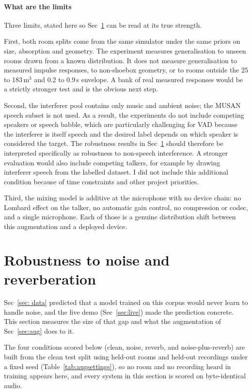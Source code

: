 \documentclass{article}
\begin{document}
\paragraph{What are the limits} Three limits, stated here so Sec~\ref{sec:robust} can be read at its true strength.

First, both room splits come from the same simulator under the same priors on size, absorption and geometry. The experiment measures generalisation to unseen rooms drawn from a known distribution. It does not measure generalisation to measured impulse responses, to non-shoebox geometry, or to rooms outside the 25 to 183\,m$^3$ and 0.2 to 0.9\,s envelope. A bank of real measured responses would be a strictly stronger test and is the obvious next step.

Second, the interferer pool contains only music and ambient noise; the MUSAN speech subset is not used. As a result, the experiments do not include competing speakers or speech babble, which are particularly challenging for VAD because the interferer is itself speech and the desired label depends on which speaker is considered the target. The robustness results in Sec~\ref{sec:robust} should therefore be interpreted specifically as robustness to non-speech interference. A stronger evaluation would also include competing talkers, for example by drawing interferer speech from the labelled dataset. I did not include this additional condition because of time constraints and other project priorities. 

Third, the mixing model is additive at the microphone with no device chain: no Lombard effect on the talker, no automatic gain control, no compression or codec, and a single microphone. Each of those is a genuine distribution shift between this augmentation and a deployed device.

\newpage

\section{Robustness to noise and reverberation}
\label{sec:robust}

Sec~\ref{sec: data} predicted that a model trained on this corpus would never learn to handle noise, and the live demo (Sec~\ref{sec:live}) made the prediction concrete. This section measures the size of that gap and what the augmentation of Sec~\ref{sec:aug} does to it.

The four conditions scored below (clean, noise, reverb, and noise-plus-reverb) are built from the clean test split using held-out rooms and held-out recordings under a fixed seed (Table~\ref{tab:augsettings}), so no room and no recording heard in training appears here, and every system in this section is scored on byte-identical audio.
\end{document}
